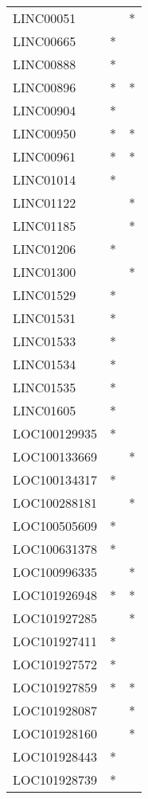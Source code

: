 \begin{longtable}{lcc}
LINC00051    &           &       * \\
LINC00665    &         * &         \\
LINC00888    &         * &         \\
LINC00896    &         * &       * \\
LINC00904    &         * &         \\
LINC00950    &         * &       * \\
LINC00961    &         * &       * \\
LINC01014    &         * &         \\
LINC01122    &           &       * \\
LINC01185    &           &       * \\
LINC01206    &         * &         \\
LINC01300    &           &       * \\
LINC01529    &         * &         \\
LINC01531    &         * &         \\
LINC01533    &         * &         \\
LINC01534    &         * &         \\
LINC01535    &         * &         \\
LINC01605    &         * &         \\
LOC100129935 &         * &         \\
LOC100133669 &           &       * \\
LOC100134317 &         * &         \\
LOC100288181 &           &       * \\
LOC100505609 &         * &         \\
LOC100631378 &         * &         \\
LOC100996335 &           &       * \\
LOC101926948 &         * &       * \\
LOC101927285 &           &       * \\
LOC101927411 &         * &         \\
LOC101927572 &         * &         \\
LOC101927859 &         * &       * \\
LOC101928087 &           &       * \\
LOC101928160 &           &       * \\
LOC101928443 &         * &         \\
LOC101928739 &         * &         \\

\end{longtable}
